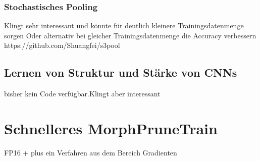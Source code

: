\subsubsection{Stochastisches Pooling}

Klingt sehr interessant und könnte für deutlich kleinere Trainingsdatenmenge sorgen
Oder alternativ bei gleicher Trainingsdatenmenge die Accuracy verbessern
https://github.com/Shuangfei/s3pool

\subsection{Lernen von Struktur und Stärke von CNNs}

bisher kein Code verfügbar.Klingt aber interessant




\section{Schnelleres MorphPruneTrain}
FP16 + plus ein Verfahren aus dem Bereich Gradienten

